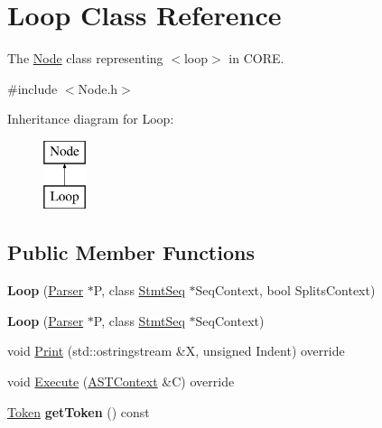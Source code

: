 \hypertarget{class_loop}{}\section{Loop Class Reference}
\label{class_loop}


The \mbox{\hyperlink{class_node}{Node}} class representing {\ttfamily $<$loop$>$} in C\+O\+RE.  




{\ttfamily \#include $<$Node.\+h$>$}

Inheritance diagram for Loop\+:\begin{figure}[H]
\begin{center}
\leavevmode
\includegraphics[height=2.000000cm]{class_loop}
\end{center}
\end{figure}
\subsection*{Public Member Functions}
\begin{DoxyCompactItemize}
\item 
\mbox{\label{class_loop_aa87032d7991bfb467c1d62b58730c1de}} 
{\bfseries Loop} (\mbox{\hyperlink{class_parser}{Parser}} $\ast$P, class \mbox{\hyperlink{class_stmt_seq}{Stmt\+Seq}} $\ast$Seq\+Context, bool Splits\+Context)
\item 
\mbox{\label{class_loop_a333a55c33661bc72479f076b61f2ae78}} 
{\bfseries Loop} (\mbox{\hyperlink{class_parser}{Parser}} $\ast$P, class \mbox{\hyperlink{class_stmt_seq}{Stmt\+Seq}} $\ast$Seq\+Context)
\item 
void \mbox{\hyperlink{class_loop_aa2907209a033f57b7ca8bbee857b2bfe}{Print}} (std\+::ostringstream \&X, unsigned Indent) override
\item 
void \mbox{\hyperlink{class_loop_aaf0a44c940844b8ac4ac521dbb703f9a}{Execute}} (\mbox{\hyperlink{class_a_s_t_context}{A\+S\+T\+Context}} \&C) override
\item 
\mbox{\label{class_loop_aa4415b3f37e5901a83bca827b79ab7eb}} 
\mbox{\hyperlink{class_token}{Token}} {\bfseries get\+Token} () const
\end{DoxyCompactItemize}
